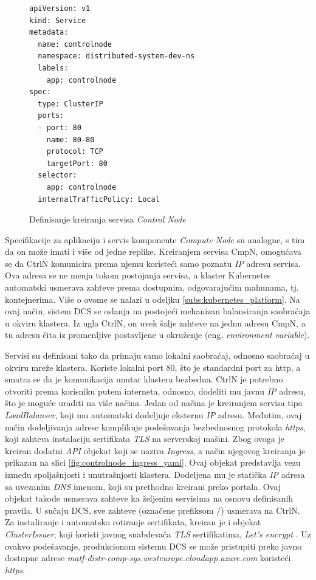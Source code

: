 \documentclass[12pt,oneside]{memoir}
\begin{document}
\begin{figure}[h!]
\centering
\begin{lstlisting}[style=yaml]
apiVersion: v1
kind: Service
metadata:
  name: controlnode
  namespace: distributed-system-dev-ns
  labels:
    app: controlnode
spec:
  type: ClusterIP
  ports:
  - port: 80
    name: 80-80
    protocol: TCP
    targetPort: 80
  selector:
    app: controlnode
  internalTrafficPolicy: Local
\end{lstlisting}
\caption{Definisanje kreiranja servisa \emph{Control Node}}
\label{fig:controlnode_service_yaml}
\end{figure}

Specifikacije za aplikaciju i servis komponente \emph{Compute Node} su analogne, s tim da on može imati i više od jedne replike. Kreiranjem servisa CmpN, omogućava se da CtrlN komunicira prema njemu koristeći samo poznatu \emph{IP} adresu servisa. Ova adresa se ne menja tokom postojanja servisa, a klaster Kubernetes automatski usmerava zahteve prema dostupnim, odgovarajućim mahunama, tj. kontejnerima. Više o ovome se nalazi u odeljku \ref{subs:kubernetes_platform}. Na ovaj način, sistem DCS se oslanja na postojeći mehanizan balansiranja saobraćaja u okviru klastera. Iz ugla CtrlN, on uvek šalje zahteve na jednu adresu CmpN, a tu adresu čita iz promenljive postavljene u okruženje (eng. \emph{environment variable}).

Servisi su definisani tako da primaju samo lokalni saobraćaj, odnosno saobraćaj u okviru mreže klastera. Koriste lokalni port 80, što je standardni port za http, a smatra se da je komunikacija unutar klastera bezbedna. CtrlN je potrebno otvoriti prema korisniku putem interneta, odnosno, dodeliti mu javnu \emph{IP} adresu, što je moguće uraditi na više načina. Jedan od načina je kreiranjem servisa tipa \emph{LoadBalanser}, koji mu automatski dodeljuje eksternu \emph{IP} adresu. Međutim, ovaj način dodeljivanja adrese komplikuje podešavanja bezbednosnog protokola \emph{https}, koji zahteva instalaciju sertifikata \emph{TLS} na serverskoj mašini. Zbog ovoga je kreiran dodatni \emph{API} objekat koji se naziva \emph{Ingress}, a način njegovog kreiranja je prikazan na slici \ref{fig:controlnode_ingress_yaml}. Ovaj objekat predstavlja vezu između spoljašnjosti i unutrašnjosti klastera. Dodeljena mu je statička \emph{IP} adresa sa uvezanim \emph{DNS} imenom, koji su prethodno kreirani preko portala. Ovaj objekat takođe usmerava zahteve ka željenim servisima na osnovu definisanih pravila. U sučaju DCS, sve zahteve (označene prefiksom /) usmerava na CtrlN. Za instaliranje i automatsko rotiranje sertifikata, kreiran je i objekat \emph{ClusterIssuer}, koji koristi javnog snabdevača \emph{TLS} sertifikatima, \emph{Let's encrypt} \cite{letsencrypt}. Uz ovakvo podešavanje, produkcionom sistemu DCS se može pristupiti preko javno dostupne adrese \emph{matf-distr-comp-sys.westeurope.cloudapp.azure.com} koristeći \emph{https}.
\end{document}

